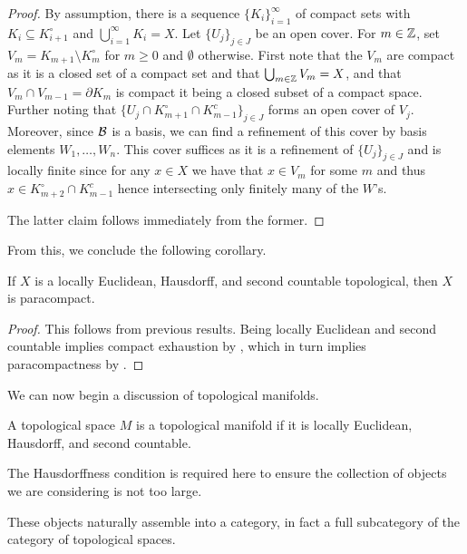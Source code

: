 \begin{proof}
    By assumption, there is a sequence $\{K_{i}\}_{i=1}^{\infty}$ of compact sets with $K_{i}\subseteq K_{i+1}^{\circ}$ and $\bigcup_{i=1}^{\infty}K_{i}=X$. Let $\{U_{j}\}_{j\in J}$ be an open cover. For $m\in\mathbb{Z}$, set $V_{m}=K_{m+1}\setminus K_{m}^{\circ}$ for $m\geq0$ and $\emptyset$ otherwise. First note that the $V_{m}$ are compact as it is a closed set of a compact set and that $\bigcup_{m\in\mathbb{Z}}V_{m}=X$, and that $V_{m}\cap V_{m-1}=\partial K_{m}$ is compact it being a closed subset of a compact space. Further noting that $\{U_{j}\cap K_{m+1}^{\circ}\cap K_{m-1}^{c}\}_{j\in J}$ forms an open cover of $V_{j}$. Moreover, since $\mathcal{B}$ is a basis, we can find a refinement of this cover by basis elements $W_{1},\dots,W_{n}$. This cover suffices as it is a refinement of $\{U_{j}\}_{j\in J}$ and is locally finite since for any $x\in X$ we have that $x\in V_{m}$ for some $m$ and thus $x\in K_{m+2}^{\circ}\cap K_{m-1}^{c}$ hence intersecting only finitely many of the $W$'s. 

    The latter claim follows immediately from the former. 
\end{proof}
From this, we conclude the following corollary. 
\begin{corollary}\label{corr: manifolds are paracompact}
    If $X$ is a locally Euclidean, Hausdorff, and second countable topological, then $X$ is paracompact. 
\end{corollary}
\begin{proof}
    This follows from previous results. Being locally Euclidean and second countable implies compact exhaustion by , which in turn implies paracompactness by . 
\end{proof}
We can now begin a discussion of topological manifolds. 
\begin{definition}\label{def: topological manifold}
    A topological space $M$ is a topological manifold if it is locally Euclidean, Hausdorff, and second countable. 
\end{definition}
\begin{remark}
    The Hausdorffness condition is required here to ensure the collection of objects we are considering is not too large. 
\end{remark}
These objects naturally assemble into a category, in fact a full subcategory of the category of topological spaces. 
